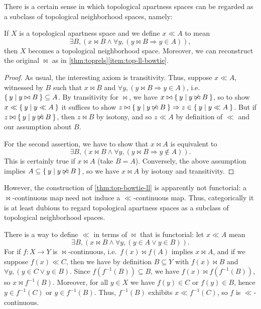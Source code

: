 \documentclass{article}
\let\implies\Rightarrow
\def\inv{^{-1}}
\begin{document}
There is a certain sense in which topological apartness spaces can be regarded as a subclass of topological neighborhood spaces, namely:

\begin{lem}\label{thm:top-bowtie-ll}
  If $X$ is a topological apartness space and we define $x\ll A$ to mean
  \begin{equation}
    \exists B, (x\bowtie B \land \forall y, (y\bowtie B \implies y\in A)),\label{eq:top-bowtie-ll-1}
  \end{equation}
  then $X$ becomes a topological neighborhood space.
  Moreover, we can reconstruct the original $\bowtie$ as in \cref{thm:toprels}\ref{item:top-ll-bowtie}.
\end{lem}
\begin{proof}
  As usual, the interesting axiom is transitivity.
  Thus, suppose $x\ll A$, witnessed by $B$ such that $x\bowtie B$ and $\forall y,(y\bowtie B \implies y\in A)$, i.e.\ $\Set{y|y\bowtie B} \subseteq A$.
  By transitivity for $\bowtie$, we have $x\bowtie \Set{y|y\not\bowtie B}$, so to show $x\ll \Set{y|y\ll A}$ it suffices to show $z\bowtie \setof{y|y\not\bowtie B} \implies z\in \setof{y|y\ll A}$.
  But if $z\bowtie \Set{y|y\not\bowtie B}$, then $z\bowtie B$ by isotony, and so $z\ll A$ by definition of $\ll$ and our assumption about $B$.
  
  For the second assertion, we have to show that $x\bowtie A$ is equivalent to
  \[\exists B, (x\bowtie B \land \forall y, (y\bowtie B \implies y\notin A)).\]
  This is certainly true if $x\bowtie A$ (take $B=A$).
  Conversely, the above assumption implies $A \subseteq \Set{y|y\not\bowtie B}$, so we have $x\bowtie A$ by isotony and transitivity.
\end{proof}

However, the construction of \cref{thm:top-bowtie-ll} is apparently not functorial: a $\bowtie$-continuous map need not induce a $\ll$-continuous map.
Thus, categorically it is at least dubious to regard topological apartness spaces as a subclass of topological neighborhood spaces.

There is a way to define $\ll$ in terms of $\bowtie$ that is functorial: let $x\ll A$ mean
\begin{equation}
  \exists B, (x\bowtie B \land \forall y, (y\in A \lor y\in B)).\label{eq:top-bowtie-ll-2}
\end{equation}
For if $f:X\to Y$ is $\bowtie$-continuous, i.e.\ $f(x)\bowtie f(A)$ implies $x\bowtie A$, and if we suppose $f(x)\ll C$, then we have by definition $B\subseteq Y$ with $f(x)\bowtie B$ and $\forall y, (y\in C \lor y\in B)$.
Since $f(f\inv(B))\subseteq B$, we have $f(x)\bowtie f(f\inv(B))$, so $x\bowtie f\inv(B)$.
Moreover, for all $y\in X$ we have $f(y)\in C$ or $f(y)\in B$, hence $y\in f\inv(C)$ or $y\in f\inv(B)$.
Thus, $f\inv(B)$ exhibits $x\ll f\inv(C)$, so $f$ is $\ll$-continuous.
\end{document}
